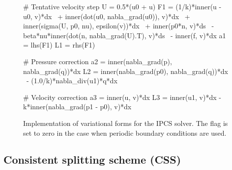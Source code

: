 \begin{figure}
\bwfig
    \begin{python}
# Tentative velocity step
U = 0.5*(u0 + u)
F1 = (1/k)*inner(u - u0, v)*dx \
   + inner(dot(u0, nabla_grad(u0)), v)*dx \
   + inner(sigma(U, p0, nu), epsilon(v))*dx \
   + inner(p0*n, v)*ds \
   - beta*nu*inner(dot(n, nabla_grad(U).T), v)*ds \
   - inner(f, v)*dx
a1 = lhs(F1)
L1 = rhs(F1)

# Pressure correction
a2 = inner(nabla_grad(p), nabla_grad(q))*dx
L2 = inner(nabla_grad(p0), nabla_grad(q))*dx \
   - (1.0/k)*nabla_div(u1)*q*dx

# Velocity correction
a3 = inner(u, v)*dx
L3 = inner(u1, v)*dx - k*inner(nabla_grad(p1 - p0), v)*dx
    \end{python}
    \caption{Implementation of variational forms for the IPCS
      solver. The flag  is set to zero in the case when
      periodic boundary conditions are used.}
    \label{fig:IPCS}
\end{figure}

\subsection{Consistent splitting scheme (CSS)}
\label{sec:css}


